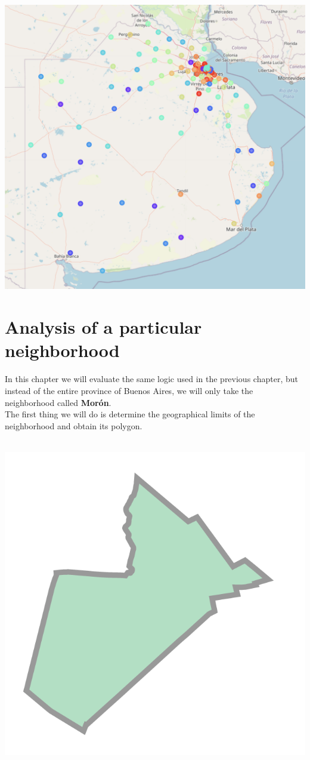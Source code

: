 \documentclass[12pt,a4paper]{tesis}
\begin{document}
\centerline{
	\includegraphics[scale=0.4]{mapa10}
}

\chapter{Analysis of a particular neighborhood}
In this chapter we will evaluate the same logic used in the previous chapter, but instead of the entire province of Buenos Aires, we will only take the neighborhood called \textbf{Morón}. \\

The first thing we will do is determine the geographical limits of the neighborhood and obtain its polygon. \\ \\

\centerline{
	\includegraphics[scale=0.5]{moron}
}
\end{document}
